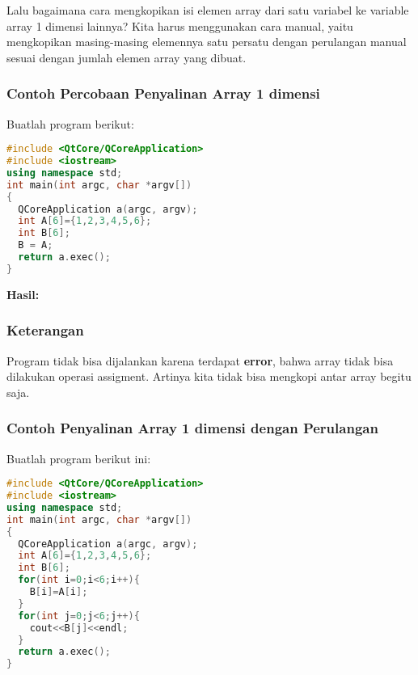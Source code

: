 Lalu bagaimana cara mengkopikan isi elemen array dari satu variabel ke
variable array 1 dimensi lainnya? Kita harus menggunakan cara manual,
yaitu mengkopikan masing-masing elemennya satu persatu dengan perulangan
manual sesuai dengan jumlah elemen array yang dibuat.

\subsubsection*{Contoh  Percobaan Penyalinan Array 1 dimensi}

Buatlah program berikut:

\begin{lstlisting}[language=c++, caption=Percobaan Penyalinan Array 1 dimensi, label=contoh3-8]
#include <QtCore/QCoreApplication>
#include <iostream>
using namespace std;
int main(int argc, char *argv[])
{
  QCoreApplication a(argc, argv);
  int A[6]={1,2,3,4,5,6};
  int B[6];
  B = A;
  return a.exec();
}
\end{lstlisting}

\textbf{Hasil:}

\begin{figure}[htbp]
\centering
{}

\end{figure}

\subsubsection*{Keterangan}

Program tidak bisa dijalankan karena terdapat \textbf{error}, bahwa
array tidak bisa dilakukan operasi assigment. Artinya kita tidak bisa
mengkopi antar array begitu saja.

\subsubsection*{Contoh  Penyalinan Array 1 dimensi dengan Perulangan}

Buatlah program berikut ini:

\begin{lstlisting}[language=c++, caption=Penyalinan Array 1 dimensi dengan Perulangan, label=contoh3-9]
#include <QtCore/QCoreApplication>
#include <iostream>
using namespace std;
int main(int argc, char *argv[])
{
  QCoreApplication a(argc, argv);
  int A[6]={1,2,3,4,5,6};
  int B[6];
  for(int i=0;i<6;i++){
    B[i]=A[i];
  }
  for(int j=0;j<6;j++){
    cout<<B[j]<<endl;
  }
  return a.exec();
}
\end{lstlisting}

